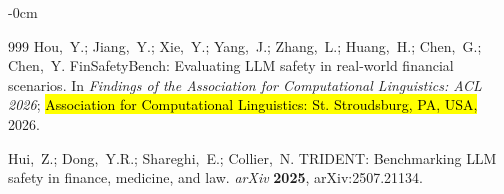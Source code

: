 \documentclass[superintelligence,article,accept,moreauthors]{Definitions/mdpi}
\begin{document}
\begin{adjustwidth}{-\extralength}{0cm}
{\begin{thebibliography}{999}
Hou,~Y.; Jiang,~Y.; Xie,~Y.; Yang,~J.; Zhang,~L.; Huang,~H.; Chen,~G.; Chen,~Y.
{FinSafetyBench}: Evaluating {LLM} safety in real-world financial scenarios.
In {\em Findings of the Association for Computational Linguistics: ACL 2026}; \hl{Association for Computational Linguistics: St. Stroudsburg, PA, USA,} 2026.

Hui,~Z.; Dong,~Y.R.; Shareghi,~E.; Collier,~N.
{TRIDENT}: Benchmarking {LLM} safety in finance, medicine, and law.
{\em arXiv} {\bf 2025}, arXiv:2507.21134.
\end{thebibliography}
}

\PublishersNote{}
\end{adjustwidth}
\end{document}
